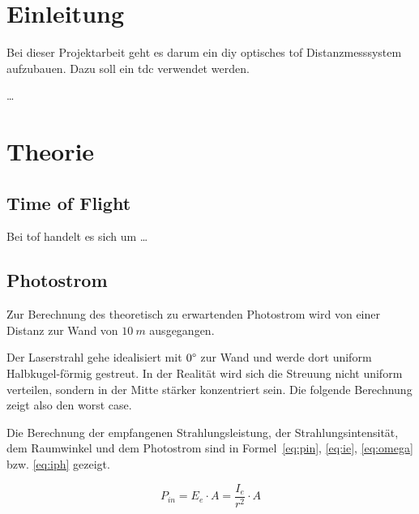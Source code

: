 \documentclass[11pt,a4paper,hidelinks]{article}
\begin{document}










\section{Einleitung}

Bei dieser Projektarbeit geht es darum ein \acrfull{diy} optisches \acrfull{tof} Distanzmesssystem aufzubauen. Dazu soll ein \acrfull{tdc} verwendet werden.

\dots

\pagebreak

\section{Theorie}

\subsection{Time of Flight}

Bei \acrshort{tof} handelt es sich um \dots

\pagebreak

\subsection{Photostrom}

Zur Berechnung des theoretisch zu erwartenden Photostrom wird von einer Distanz zur Wand von $10~m$ ausgegangen.

Der Laserstrahl gehe idealisiert mit $0\degree$ zur Wand und werde dort uniform Halbkugel-förmig gestreut. In der Realität wird sich die Streuung nicht uniform verteilen, sondern in der Mitte stärker konzentriert sein. Die folgende Berechnung zeigt also den worst case.

Die Berechnung der empfangenen Strahlungsleistung, der Strahlungsintensität, dem Raumwinkel und dem Photostrom sind in Formel~\ref{eq:pin}, \ref{eq:ie}, \ref{eq:omega} bzw. \ref{eq:iph} gezeigt.

\begin{equation}\label{eq:pin}
    P_{in} = E_e \cdot A = \frac{I_e}{r^2} \cdot A
\end{equation}
\end{document}
